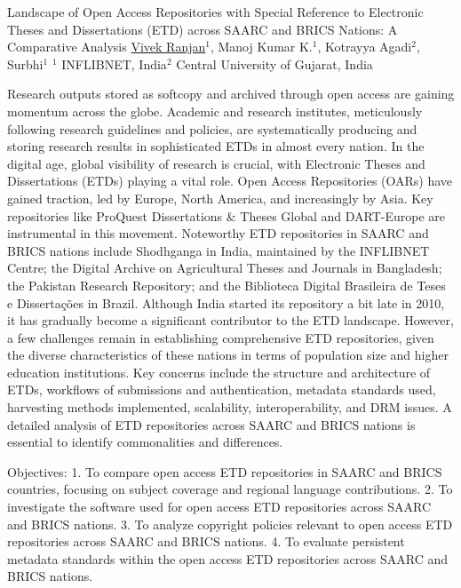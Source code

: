 \begin{abstract_online}{Landscape of Open Access Repositories with Special Reference to Electronic Theses and Dissertations (ETD) across SAARC and BRICS Nations: A Comparative Analysis}{%
    \underline{Vivek Ranjan}$^{1}$, Manoj Kumar K.$^{1}$, Kotrayya Agadi$^{2}$, Surbhi$^{1}$}{%
    }{%
    $^1$ INFLIBNET, India\newline{}$^2$ Central University of Gujarat, India}

Research outputs stored as softcopy and archived through open access are gaining momentum across the globe. Academic and research institutes, meticulously following research guidelines and policies, are systematically producing and storing research results in sophisticated ETDs in almost every nation. In the digital age, global visibility of research is crucial, with Electronic Theses and Dissertations (ETDs) playing a vital role. Open Access Repositories (OARs) have gained traction, led by Europe, North America, and increasingly by Asia. Key repositories like ProQuest Dissertations & Theses Global and DART-Europe are instrumental in this movement. Noteworthy ETD repositories in SAARC and BRICS nations include Shodhganga in India, maintained by the INFLIBNET Centre; the Digital Archive on Agricultural Theses and Journals in Bangladesh; the Pakistan Research Repository; and the Biblioteca Digital Brasileira de Teses e Dissertações in Brazil. Although India started its repository a bit late in 2010, it has gradually become a significant contributor to the ETD landscape. However, a few challenges remain in establishing comprehensive ETD repositories, given the diverse characteristics of these nations in terms of population size and higher education institutions. Key concerns include the structure and architecture of ETDs, workflows of submissions and authentication, metadata standards used, harvesting methods implemented, scalability, interoperability, and DRM issues. A detailed analysis of ETD repositories across SAARC and BRICS nations is essential to identify commonalities and differences.

Objectives:
1. To compare open access ETD repositories in SAARC and BRICS countries, focusing on subject coverage and regional language contributions.
2. To investigate the software used for open access ETD repositories across SAARC and BRICS nations.
3. To analyze copyright policies relevant to open access ETD repositories across SAARC and BRICS nations.
4. To evaluate persistent metadata standards within the open access ETD repositories across SAARC and BRICS nations.


\end{abstract_online}
